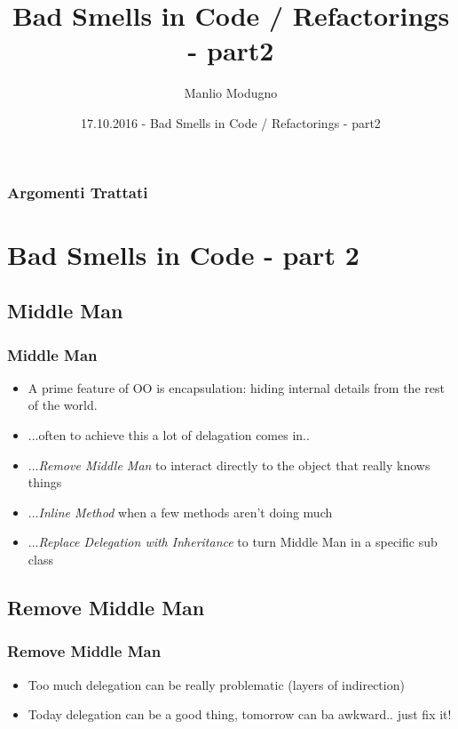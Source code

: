 \documentclass{beamer}
\title{Bad Smells in Code / Refactorings - part2}
\author{Manlio Modugno}
\institute[GMTechnologies]
\date[17.10.2016] 
{17.10.2016 - Bad Smells in Code / Refactorings - part2}
\begin{document}
\begin{frame}
  \titlepage
\end{frame}

\begin{frame}
  \frametitle{Argomenti Trattati}
  \tableofcontents
\end{frame}

\section{Bad Smells in Code - part 2}

\subsection{Middle Man}
\begin{frame}
  \frametitle{Middle Man}
  \begin{itemize}
	\item<+-> A prime feature of OO is encapsulation: hiding internal details from the rest of the world.
	\item<+-> ...often to achieve this a lot of delagation comes in..
	\item<+-> ...\textit{Remove Middle Man} to interact directly to the object that really knows things
	\item<+-> ...\textit{Inline Method} when a few methods aren't doing much
	\item<+-> ...\textit{Replace Delegation with Inheritance} to turn Middle Man in a specific sub class
   \end{itemize}
\end{frame}

\subsection{Remove Middle Man}
\begin{frame}
  \frametitle{Remove Middle Man}
  \begin{itemize}
	\item<+-> Too much delegation can be really problematic (layers of indirection)
	\item<+-> Today delegation can be a good thing, tomorrow can ba awkward.. just fix it!
   \end{itemize}
\end{frame}
\end{document}
